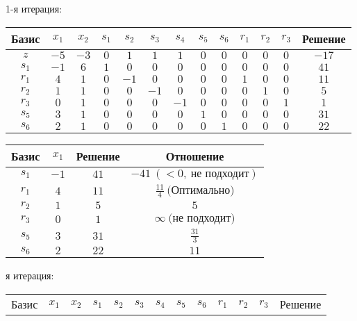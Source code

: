 \documentclass{article}%
\begin{document}
\begin{flushleft}%
1{-}я итерация: %
\newline%
\newline%
\renewcommand{\arraystretch}{1.3}%
\begin{tabular}{|c|ccccccccccc|c|}%
\hline%
Базис&$x_{1}$&$x_{2}$&$s_{1}$&$s_{2}$&$s_{3}$&$s_{4}$&$s_{5}$&$s_{6}$&$r_{1}$&$r_{2}$&$r_{3}$&Решение\\%
\hline%
$z$&$-5$&$-3$&$0$&$1$&$1$&$1$&$0$&$0$&$0$&$0$&$0$&$-17$\\%
\hline%
$s_{1}$&$-1$&$6$&$1$&$0$&$0$&$0$&$0$&$0$&$0$&$0$&$0$&$41$\\%
$r_{1}$&$4$&$1$&$0$&$-1$&$0$&$0$&$0$&$0$&$1$&$0$&$0$&$11$\\%
$r_{2}$&$1$&$1$&$0$&$0$&$-1$&$0$&$0$&$0$&$0$&$1$&$0$&$5$\\%
$r_{3}$&$0$&$1$&$0$&$0$&$0$&$-1$&$0$&$0$&$0$&$0$&$1$&$1$\\%
$s_{5}$&$3$&$1$&$0$&$0$&$0$&$0$&$1$&$0$&$0$&$0$&$0$&$31$\\%
$s_{6}$&$2$&$1$&$0$&$0$&$0$&$0$&$0$&$1$&$0$&$0$&$0$&$22$\\%
\hline%
\end{tabular}%
\newline%
\newline%
\newline%
\begin{tabular}{|cccc|}%
\hline%
Базис&$x_{1}$&Решение&Отношение\\%
\hline%
$s_{1}$&$-1$&$41$&$-41\: (< 0, \: \text{не подходит})$\\%
$r_{1}$&$4$&$11$&$\frac{11}{4}\: \text{(Оптимально)}$\\%
$r_{2}$&$1$&$5$&$5$\\%
$r_{3}$&$0$&$1$&$\infty \: \text{(не подходит)}$\\%
$s_{5}$&$3$&$31$&$\frac{31}{3}$\\%
$s_{6}$&$2$&$22$&$11$\\%
\hline%
\end{tabular}%
\newline%
\newline%
я итерация: %
\newline%
\newline%
\renewcommand{\arraystretch}{1.3}%
\begin{tabular}{|c|ccccccccccc|c|}%
\hline%
Базис&$x_{1}$&$x_{2}$&$s_{1}$&$s_{2}$&$s_{3}$&$s_{4}$&$s_{5}$&$s_{6}$&$r_{1}$&$r_{2}$&$r_{3}$&Решение\\%

\end{tabular}
\end{flushleft}
\end{document}
